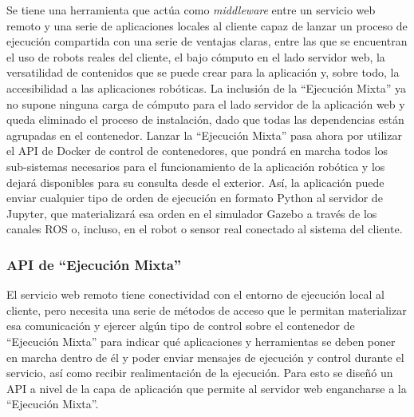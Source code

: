 Se tiene una herramienta que actúa como \textit{middleware} entre un servicio web remoto y una serie de aplicaciones locales al cliente capaz de lanzar un proceso de ejecución compartida con una serie de ventajas claras, entre las que se encuentran el uso de robots reales del cliente, el bajo cómputo en el lado servidor web, la versatilidad de contenidos que se puede crear para la aplicación y, sobre todo, la accesibilidad a las aplicaciones robóticas. La inclusión de la ``Ejecución Mixta'' ya no supone ninguna carga de cómputo para el lado servidor de la aplicación web y queda eliminado el proceso de instalación, dado que todas las dependencias están agrupadas en el contenedor. Lanzar la ``Ejecución Mixta'' pasa ahora por utilizar el API de Docker de control de contenedores, que pondrá en marcha todos los sub-sistemas necesarios para el funcionamiento de la aplicación robótica y los dejará disponibles para su consulta desde el exterior. Así, la aplicación puede enviar cualquier tipo de orden de ejecución en formato Python al servidor de Jupyter, que materializará esa orden en el simulador Gazebo a través de los canales ROS o, incluso, en el robot o sensor real conectado al sistema del cliente.

\subsubsection{API de ``Ejecución Mixta''}

El servicio web remoto tiene conectividad con el entorno de ejecución local al cliente, pero necesita una serie de métodos de acceso que le permitan materializar esa comunicación y ejercer algún tipo de control sobre el contenedor de ``Ejecución Mixta'' para indicar qué aplicaciones y herramientas se deben poner en marcha dentro de él y poder enviar mensajes de ejecución y control durante el servicio, así como recibir realimentación de la ejecución. Para esto se diseñó un API a nivel de la capa de aplicación que permite al servidor web engancharse a la ``Ejecución Mixta''.

